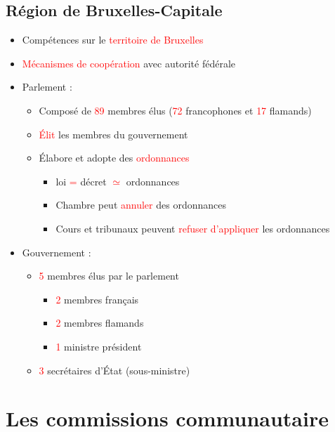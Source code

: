 \subsection{Région de Bruxelles-Capitale}
\begin{itemize}
	\item Compétences sur le \textcolor{red}{territoire de Bruxelles}
	\item \textcolor{red}{Mécanismes de coopération} avec autorité fédérale
	\item Parlement :
	\begin{itemize}
		\item Composé de \textcolor{red}{89} membres élus (\textcolor{red}{72} francophones et \textcolor{red}{17} flamands)
		\item \textcolor{red}{Élit} les membres du gouvernement
		\item Élabore et adopte des \textcolor{red}{ordonnances}
		\begin{itemize}
			\item loi \textcolor{red}{=} décret \textcolor{red}{$\simeq$} ordonnances
			\item Chambre peut \textcolor{red}{annuler} des ordonnances
			\item Cours et tribunaux peuvent \textcolor{red}{refuser d'appliquer} les ordonnances
 		\end{itemize}
	\end{itemize}
	\item Gouvernement :
	\begin{itemize}
		\item \textcolor{red}{5} membres élus par le parlement
		\begin{itemize}
			\item \textcolor{red}{2} membres français
			\item \textcolor{red}{2} membres flamands
			\item \textcolor{red}{1} ministre président
		\end{itemize}
		\item \textcolor{red}{3} secrétaires d'État (sous-ministre)
	\end{itemize}
\end{itemize}

\section{Les commissions communautaire}
